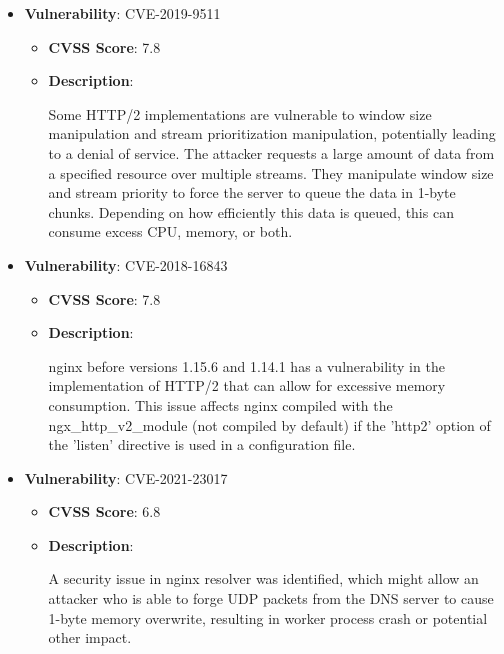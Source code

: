 \documentclass{article}
\begin{document}
\begin{itemize}
        \item \textbf{Vulnerability}: CVE-2019-9511
        \begin{itemize}
            \item \textbf{CVSS Score}:  7.8 
            \item \textbf{Description}:
            \parbox[t]{0.9\linewidth}{
                \ttfamily Some HTTP/2 implementations are vulnerable to window size manipulation and stream prioritization manipulation, potentially leading to a denial of service. The attacker requests a large amount of data from a specified resource over multiple streams. They manipulate window size and stream priority to force the server to queue the data in 1-byte chunks. Depending on how efficiently this data is queued, this can consume excess CPU, memory, or both.
            }
        \end{itemize}
    
        \item \textbf{Vulnerability}: CVE-2018-16843
        \begin{itemize}
            \item \textbf{CVSS Score}:  7.8 
            \item \textbf{Description}:
            \parbox[t]{0.9\linewidth}{
                \ttfamily nginx before versions 1.15.6 and 1.14.1 has a vulnerability in the implementation of HTTP/2 that can allow for excessive memory consumption. This issue affects nginx compiled with the ngx\_http\_v2\_module (not compiled by default) if the 'http2' option of the 'listen' directive is used in a configuration file.
            }
        \end{itemize}
    
        \item \textbf{Vulnerability}: CVE-2021-23017
        \begin{itemize}
            \item \textbf{CVSS Score}:  6.8 
            \item \textbf{Description}:
            \parbox[t]{0.9\linewidth}{
                \ttfamily A security issue in nginx resolver was identified, which might allow an attacker who is able to forge UDP packets from the DNS server to cause 1-byte memory overwrite, resulting in worker process crash or potential other impact.
            }
        \end{itemize}
    

\end{itemize}
\end{document}
